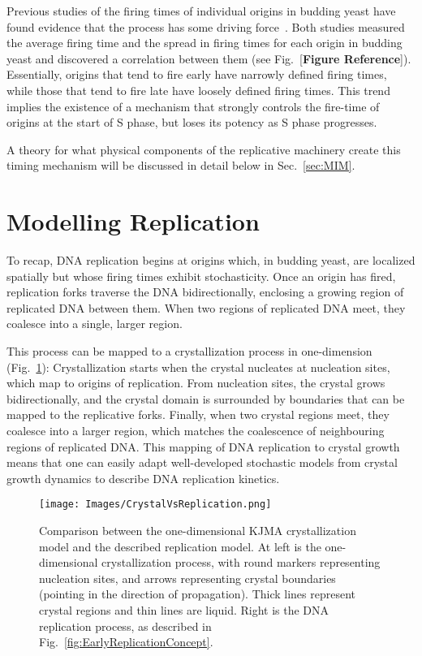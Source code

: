 		Previous studies of the firing times of individual origins in budding yeast have found evidence that the process has some driving force~\cite{ScottsPaper,StochasticTermination}.
		Both studies measured the average firing time and the spread in firing times for each origin in budding yeast and discovered a correlation between them (see Fig.~[\textbf{Figure Reference}]).
		Essentially, origins that tend to fire early have narrowly defined firing times, while those that tend to fire late have loosely defined firing times.
		This trend implies the existence of a mechanism that strongly controls the fire-time of origins at the start of S phase, but loses its potency as S phase progresses.
		
		A theory for what physical components of the replicative machinery create this timing mechanism will be discussed in detail below in Sec.~\ref{sec:MIM}.
		
		
	\section{Modelling Replication}
	\label{sec:Modelling}
	
	To recap, DNA replication begins at origins which, in budding yeast, are localized spatially but whose firing times exhibit stochasticity.
	Once an origin has fired, replication forks traverse the DNA bidirectionally, enclosing a growing region of replicated DNA between them.
	When two regions of replicated DNA meet, they coalesce into a single, larger region.
	
	This process can be mapped to a crystallization process in one-dimension (Fig.~\ref{fig:CrystalVsReplication}):
	Crystallization starts when the crystal nucleates at nucleation sites, which map to origins of replication.
	From nucleation sites, the crystal grows bidirectionally, and the crystal domain is surrounded by boundaries that can be mapped to the replicative forks.
	Finally, when two crystal regions meet, they coalesce into a larger region, which matches the coalescence of neighbouring regions of replicated DNA.
	This mapping of DNA replication to crystal growth means that one can easily adapt well-developed stochastic models from crystal growth dynamics to describe DNA replication kinetics.
	
	\begin{figure}[tbh]
		\begin{center}
			\texttt{[image: Images/CrystalVsReplication.png]}
		\end{center}
			\caption[Comparing Crystallization with Replication]{\label{fig:CrystalVsReplication} Comparison between the one-dimensional KJMA crystallization model and the described replication model.
				At left is the one-dimensional crystallization process, with round markers representing nucleation sites, and arrows representing crystal boundaries (pointing in the direction of propagation).
				Thick lines represent crystal regions and thin lines are liquid.
				Right is the DNA replication process, as described in Fig.~\ref{fig:EarlyReplicationConcept}.}
	\end{figure}
	
